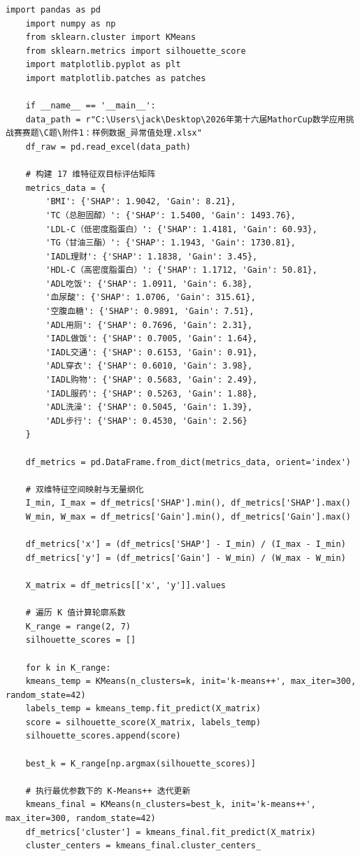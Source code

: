 \documentclass[12pt]{article}
\begin{document}
\begin{lstlisting}[caption={K-Means++双维度特征聚类筛选}, label={code:kmeans_feature_clustering}]
	import pandas as pd
	import numpy as np
	from sklearn.cluster import KMeans
	from sklearn.metrics import silhouette_score
	import matplotlib.pyplot as plt
	import matplotlib.patches as patches
	
	if __name__ == '__main__':
	data_path = r"C:\Users\jack\Desktop\2026年第十六届MathorCup数学应用挑战赛赛题\C题\附件1：样例数据_异常值处理.xlsx"
	df_raw = pd.read_excel(data_path)
	
	# 构建 17 维特征双目标评估矩阵
	metrics_data = {
		'BMI': {'SHAP': 1.9042, 'Gain': 8.21},
		'TC（总胆固醇）': {'SHAP': 1.5400, 'Gain': 1493.76},
		'LDL-C（低密度脂蛋白）': {'SHAP': 1.4181, 'Gain': 60.93},
		'TG（甘油三酯）': {'SHAP': 1.1943, 'Gain': 1730.81},
		'IADL理财': {'SHAP': 1.1838, 'Gain': 3.45},
		'HDL-C（高密度脂蛋白）': {'SHAP': 1.1712, 'Gain': 50.81},
		'ADL吃饭': {'SHAP': 1.0911, 'Gain': 6.38},
		'血尿酸': {'SHAP': 1.0706, 'Gain': 315.61},
		'空腹血糖': {'SHAP': 0.9891, 'Gain': 7.51},
		'ADL用厕': {'SHAP': 0.7696, 'Gain': 2.31},
		'IADL做饭': {'SHAP': 0.7005, 'Gain': 1.64},
		'IADL交通': {'SHAP': 0.6153, 'Gain': 0.91},
		'ADL穿衣': {'SHAP': 0.6010, 'Gain': 3.98},
		'IADL购物': {'SHAP': 0.5683, 'Gain': 2.49},
		'IADL服药': {'SHAP': 0.5263, 'Gain': 1.88},
		'ADL洗澡': {'SHAP': 0.5045, 'Gain': 1.39},
		'ADL步行': {'SHAP': 0.4530, 'Gain': 2.56}
	}
	
	df_metrics = pd.DataFrame.from_dict(metrics_data, orient='index')
	
	# 双维特征空间映射与无量纲化
	I_min, I_max = df_metrics['SHAP'].min(), df_metrics['SHAP'].max()
	W_min, W_max = df_metrics['Gain'].min(), df_metrics['Gain'].max()
	
	df_metrics['x'] = (df_metrics['SHAP'] - I_min) / (I_max - I_min)
	df_metrics['y'] = (df_metrics['Gain'] - W_min) / (W_max - W_min)
	
	X_matrix = df_metrics[['x', 'y']].values
	
	# 遍历 K 值计算轮廓系数
	K_range = range(2, 7)
	silhouette_scores = []
	
	for k in K_range:
	kmeans_temp = KMeans(n_clusters=k, init='k-means++', max_iter=300, random_state=42)
	labels_temp = kmeans_temp.fit_predict(X_matrix)
	score = silhouette_score(X_matrix, labels_temp)
	silhouette_scores.append(score)
	
	best_k = K_range[np.argmax(silhouette_scores)]
	
	# 执行最优参数下的 K-Means++ 迭代更新
	kmeans_final = KMeans(n_clusters=best_k, init='k-means++', max_iter=300, random_state=42)
	df_metrics['cluster'] = kmeans_final.fit_predict(X_matrix)
	cluster_centers = kmeans_final.cluster_centers_
	

\end{lstlisting}
\end{document}
